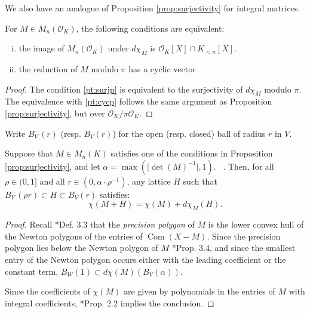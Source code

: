 \documentclass{sig-alternate-05-2015}
\DeclareMathOperator{\com}{Com}
\newcommand{\OK}{\mathcal{O}_K}
\def\todo#1{\ \!\!{\color{red} #1}}
\begin{document}
We also have an analogue of Proposition \ref{prop:surjectivity} for integral matrices.

\begin{prop}
\label{prop:intsurj}
For $M \in M_n(\OK)$, the following conditions are equivalent:
\begin{enumerate}[(i)]
\renewcommand{\itemsep}{0pt}
\item \label{pt:surjp} the image of $M_n(\OK)$ under $d\chi_M$ is $\OK[X] \cap K_{<n}[X]$.
\item \label{pt:cycp} the reduction of $M$ modulo $\pi$ has a cyclic vector
\end{enumerate}
\end{prop}
\begin{proof}
The condition \eqref{pt:surjp} is equivalent to the surjectivity of $d\chi_M$ modulo $\pi$.  The equivalence with
\eqref{pt:cycp} follows the same argument as Proposition \ref{prop:surjectivity}, but over $\OK / \pi\OK$.
\end{proof}

Write $B^-_V(r)$ (resp. $B_V(r)$) for the open (resp. closed) ball of radius $r$ in $V$.

\begin{prop} \label{prop:mainlem}
Suppose that $M \in M_n(K)$ satisfies one of the conditions in Proposition \ref{prop:surjectivity}, and
let $\alpha = \max(\lvert \det(M)^{-1} \rvert, 1)$.  \todo{What if $\det(M) = 0$?}. Then, for all $\rho \in (0, 1]$ and all
$r \in (0, \alpha \cdot \rho^{-1})$, any lattice $H$ such that $B_V^-(\rho r) \subset H \subset B_V(r)$
satisfies:
\begin{equation}
\chi(M + H) = \chi(M) + d\chi_M(H).
\end{equation}
\end{prop}

\begin{proof}

Recall \cite{caruso-roe-vaccon:15a}*{Def. 3.3} that the \emph{precision polygon}
of $M$ is the lower convex hull of the Newton polygons of the entries of $\com(X-M)$.
Since the precision polygon lies below the Newton polygon of $M$ \cite{caruso-roe-vaccon:15a}*{Prop. 3.4},
and since the smallest entry of the Newton polygon occurs either with the leading
coefficient or the constant term, $B_W(1) \subset d\chi(M)(B_V(\alpha))$.

Since the coefficients of $\chi(M)$ are given by polynomials in the entries of $M$
with integral coefficients, \cite{caruso-roe-vaccon:15a}*{Prop. 2.2} implies
the conclusion.
\end{proof}
\end{document}

